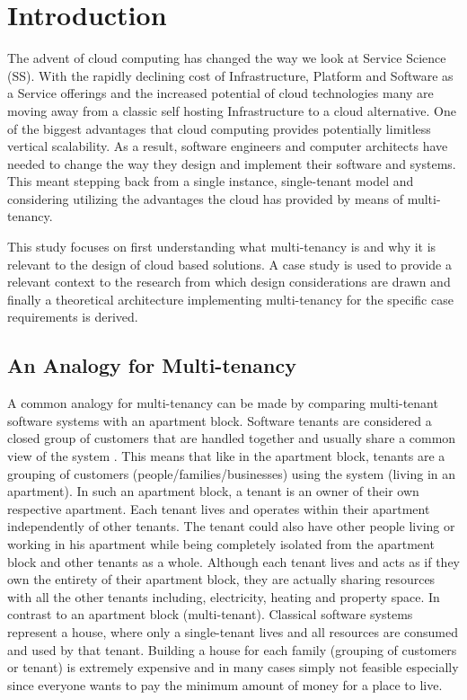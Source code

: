 \chapter{Introduction}
The advent of cloud computing has changed the way we look at Service Science (SS). With the rapidly declining cost of Infrastructure, Platform and Software as a Service offerings and the increased potential of cloud technologies many are moving away from a classic self hosting Infrastructure to a cloud alternative. One of the biggest advantages that cloud computing provides potentially limitless vertical scalability. As a result, software engineers and computer architects have needed to change the way they design and implement their software and systems. This meant stepping back from a single instance, single-tenant model and considering utilizing the advantages the cloud has provided by means of multi-tenancy.
 
This study focuses on first understanding what multi-tenancy is and why it is relevant to the design of cloud based solutions. A case study is used to provide a relevant context to the research from which design considerations are drawn and finally a theoretical architecture implementing multi-tenancy for the specific case requirements is derived.


\section{An Analogy for Multi-tenancy}

A common analogy for multi-tenancy can be made by comparing multi-tenant software systems with an apartment block. Software tenants are considered a closed group of customers that are handled together and usually share a common view of the system \cite{Krebs2012} \cite{Wilder2012-so}. This means that like in the apartment block, tenants are a grouping of customers (people/families/businesses) using the system (living in an apartment). In such an apartment block, a tenant is an owner of their own respective apartment. Each tenant lives and operates within their apartment independently of other tenants. The tenant could also have other people living or working in his apartment while being completely isolated from the apartment block and other tenants as a whole. Although each tenant lives and acts as if they own the entirety of their apartment block, they are actually sharing resources with all the other tenants including, electricity, heating and property space. In contrast to an apartment block (multi-tenant). Classical software systems represent a house, where only a single-tenant lives and all resources are consumed and used by that tenant. Building a house for each family (grouping of customers or tenant) is extremely expensive and in many cases simply not feasible especially since everyone wants to pay the minimum amount of money for a place to live.
 
